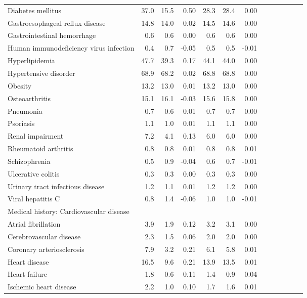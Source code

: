 \documentclass[11pt,]{article}
\begin{document}
\begin{longtable}{lrrrrrrrrrrrr}
      Diabetes mellitus & 37.0 & 15.5 &  0.50 & 28.3 & 28.4 &  0.00 \\ 
      Gastroesophageal reflux disease & 14.8 & 14.0 &  0.02 & 14.5 & 14.6 &  0.00 \\ 
      Gastrointestinal hemorrhage &  0.6 &  0.6 &  0.00 &  0.6 &  0.6 &  0.00 \\ 
      Human immunodeficiency virus infection &  0.4 &  0.7 & -0.05 &  0.5 &  0.5 & -0.01 \\ 
      Hyperlipidemia & 47.7 & 39.3 &  0.17 & 44.1 & 44.0 &  0.00 \\ 
      Hypertensive disorder & 68.9 & 68.2 &  0.02 & 68.8 & 68.8 &  0.00 \\ 
      Obesity & 13.2 & 13.0 &  0.01 & 13.2 & 13.0 &  0.00 \\ 
      Osteoarthritis & 15.1 & 16.1 & -0.03 & 15.6 & 15.8 &  0.00 \\ 
      Pneumonia &  0.7 &  0.6 &  0.01 &  0.7 &  0.7 &  0.00 \\ 
      Psoriasis &  1.1 &  1.0 &  0.01 &  1.1 &  1.1 &  0.00 \\ 
      Renal impairment &  7.2 &  4.1 &  0.13 &  6.0 &  6.0 &  0.00 \\ 
      Rheumatoid arthritis &  0.8 &  0.8 &  0.01 &  0.8 &  0.8 &  0.01 \\ 
      Schizophrenia &  0.5 &  0.9 & -0.04 &  0.6 &  0.7 & -0.01 \\ 
      Ulcerative colitis &  0.3 &  0.3 &  0.00 &  0.3 &  0.3 &  0.00 \\ 
      Urinary tract infectious disease &  1.2 &  1.1 &  0.01 &  1.2 &  1.2 &  0.00 \\ 
      Viral hepatitis C &  0.8 &  1.4 & -0.06 &  1.0 &  1.0 & -0.01 \\ 
  Medical history: Cardiovascular disease &    &    &     &    &    &     \\ 
      Atrial fibrillation &  3.9 &  1.9 &  0.12 &  3.2 &  3.1 &  0.00 \\ 
      Cerebrovascular disease &  2.3 &  1.5 &  0.06 &  2.0 &  2.0 &  0.00 \\ 
      Coronary arteriosclerosis &  7.9 &  3.2 &  0.21 &  6.1 &  5.8 &  0.01 \\ 
      Heart disease & 16.5 &  9.6 &  0.21 & 13.9 & 13.5 &  0.01 \\ 
      Heart failure &  1.8 &  0.6 &  0.11 &  1.4 &  0.9 &  0.04 \\ 
      Ischemic heart disease &  2.2 &  1.0 &  0.10 &  1.7 &  1.6 &  0.01 \\ 

\end{longtable}
\end{document}

